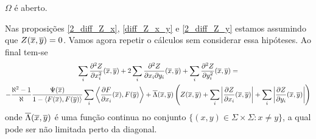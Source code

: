 \begin{proposicao}
	$\Omega$ é aberto.
\end{proposicao}

\begin{demonstracao}
	Nas proposições \ref{2_diff_Z_x}, \ref{diff_Z_x_y} e \ref{2_diff_Z_y} estamos assumindo que $Z(\overline{x},\overline{y}) = 0$. Vamos agora repetir o cálculos sem considerar essa hipóteses. Ao final tem-se
	\begin{multline*}
	\sum_i \frac{\partial^2 Z}{\partial x_i^2}(\overline{x},\overline{y}) + 2 \sum_i \frac{\partial^2 Z}{\partial x_i \partial y_i}(\overline{x},\overline{y}) + \sum_i \frac{\partial^2 Z}{\partial y_i^2}(\overline{x},\overline{y}) =\\
	- \frac{\aleph^2 - 1}{\aleph} \frac{\Psi(\overline{x})}{1 - \langle F(\overline{x}), F(\overline{y}) \rangle} \sum_i \left\langle \frac{\partial F}{\partial x_i}(\overline{x}), F(\overline{y}) \right\rangle + \overline{\Lambda}(\overline{x},\overline{y}) \left( Z(\overline{x},\overline{y}) + \sum_i \left| \frac{\partial Z}{\partial x_i}(\overline{x},\overline{y}) \right| + \sum_i \left| \frac{\partial Z}{\partial y_i}(\overline{x},\overline{y}) \right| \right)
	\end{multline*}
	onde $\overline{\Lambda}(\overline{x},\overline{y})$ é uma função continua no conjunto $\{ (x,y) \in \Sigma \times \Sigma: x \neq y \}$, a qual pode ser não limitada perto da diagonal.
	

\end{demonstracao}